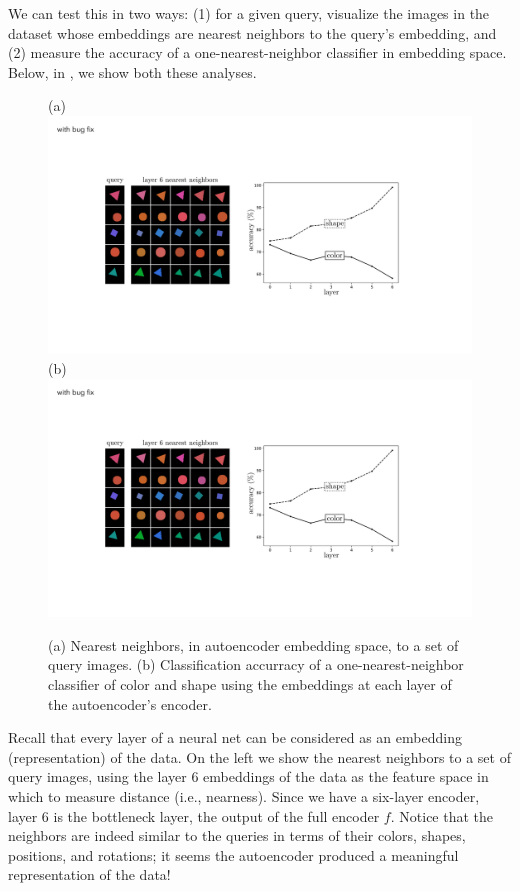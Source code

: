 We can test this in two ways: (1) for a given query, visualize the images in the dataset whose embeddings are nearest neighbors to the query's embedding, and (2) measure the accuracy of a one-nearest-neighbor classifier in embedding space. Below, in \fig{\ref{fig:representation_learning:AE_results_shapes_dataset}}, we show both these analyses.
\begin{figure}[h!]
    \centerline{
        (a) \includegraphics[width=0.38\linewidth]{figures/representation_learning/AE_NN_viz.pdf}
        (b) \includegraphics[width=0.40\linewidth]{figures/representation_learning/AE_NN_probe.pdf}
    }
    \caption{(a) Nearest neighbors, in autoencoder embedding space, to a set of query images. (b) Classification accurracy of a one-nearest-neighbor classifier of color and shape using the embeddings at each layer of the autoencoder's encoder.}
    \label{fig:representation_learning:AE_results_shapes_dataset}
\end{figure}

Recall that every layer of a neural net can be considered as an embedding (representation) of the data. On the left we show the nearest neighbors to a set of query images, using the layer 6 embeddings of the data as the feature space in which to measure distance (i.e., nearness). Since we have a six-layer encoder, layer 6 is the bottleneck layer, the output of the full encoder $f$. Notice that the neighbors are indeed similar to the queries in terms of their colors, shapes, positions, and rotations; it seems the autoencoder produced a meaningful representation of the data!

